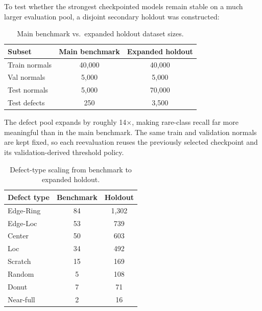 \documentclass[11pt]{article}
\begin{document}
To test whether the strongest checkpointed models remain stable on a much larger
evaluation pool, a disjoint secondary holdout was constructed:

\begin{table}[H]
\centering
\caption{Main benchmark vs.\ expanded holdout dataset sizes.}
\label{tab:holdout_sizes}
\begin{tabular}{lcc}
\toprule
Subset & Main benchmark & Expanded holdout \\
\midrule
Train normals & 40{,}000 & 40{,}000 \\
Val normals   &  5{,}000 &  5{,}000 \\
Test normals  &  5{,}000 & 70{,}000 \\
Test defects  &    250   &  3{,}500 \\
\bottomrule
\end{tabular}
\end{table}

The defect pool expands by roughly 14$\times$, making rare-class recall far more
meaningful than in the main benchmark. The same train and validation normals are
kept fixed, so each reevaluation reuses the previously selected checkpoint and
its validation-derived threshold policy.

\begin{table}[H]
\centering
\caption{Defect-type scaling from benchmark to expanded holdout.}
\label{tab:holdout_defects}
\begin{tabular}{lcc}
\toprule
Defect type & Benchmark & Holdout \\
\midrule
Edge-Ring & 84  & 1{,}302 \\
Edge-Loc  & 53  & 739     \\
Center    & 50  & 603     \\
Loc       & 34  & 492     \\
Scratch   & 15  & 169     \\
Random    &  5  & 108     \\
Donut     &  7  &  71     \\
Near-full &  2  &  16     \\
\bottomrule
\end{tabular}
\end{table}
\end{document}
